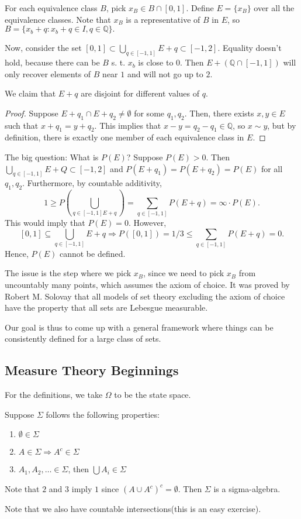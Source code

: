 \documentclass[11pt]{scrartcl}
\newcommand{\Q}{\mathbb{Q}}
\begin{document}
For each equivalence class $B$, pick $x_B \in B\cap [0, 1]$.  Define $E = \{x_B \}$ over all the equivalence classes.  Note that $x_B$ is a representative of $B$ in $E$, so $B = \{x_b + q : x_b + q \in I, q \in \Q \}.$  

Now, consider the set $[0, 1] \subset \bigcup_{q \in [-1, 1]}E + q \subset [-1, 2]$.  Equality doesn't hold, because there can be $B$ s. t. $x_b$ is close to $0$.  Then $E + (\Q \cap [-1, 1])$ will only recover elements of $B$ near $1$ and will not go up to $2$.

\begin{proposition} We claim that $E+q$ are disjoint for different values of $q$.
\end{proposition}
\begin{proof}
Suppose $E+q_1 \cap E+q_2 \ne \emptyset$ for some $q_1, q_2$.  Then, there exists $x, y \in E$ such that $x+q_1 = y + q_2$.  This implies that $x-y = q_2 - q_1 \in \Q$, so $x \sim y$, but by definition, there is exactly one member of each equivalence class in $E$.  
\end{proof}

The big question: What is $P(E)$?  Suppose $P(E) > 0$.  Then $\bigcup_{q \in [-1, 1]} E + Q \subset [-1, 2]$ and $P(E + q_1) = P(E + q_2) = P(E)$ for all $q_1, q_2$.  Furthermore, by countable additivity,
$$1 \ge P(\bigcup_{q \in [-1, 1] E + q}) = \sum_{q \in [-1, 1]} P(E + q) = \infty \cdot P(E).$$
This would imply that $P(E) = 0$.  However, $$[0, 1] \subseteq \bigcup_{q \in [-1, 1]}E + q \Rightarrow P([0, 1]) = 1/3 \le \sum_{q \in[-1, 1]} P(E+q) = 0.$$  Hence, $P(E)$ cannot be defined.

The issue is the step where we pick $x_B$, since we need to pick $x_B$ from uncountably many points, which assumes the axiom of choice.  It was proved by Robert M. Solovay that all models of set theory excluding the axiom of choice have the property that all sets are Lebesgue measurable.

Our goal is thus to come up with a general framework where things can be consistently defined for a large class of sets.  
\subsection{Measure Theory Beginnings}  For the definitions, we take $\Omega$ to be the state space.
\begin{definition}  Suppose $\Sigma$ follows the following properties:
\begin{enumerate}
\item $\emptyset \in \Sigma$
\item $A \in \Sigma \Rightarrow A^c \in \Sigma$
\item $A_1, A_2, \dots \in \Sigma$, then $\bigcup A_i \in \Sigma$
\end{enumerate}
Note that $2$ and $3$ imply $1$ since $(A \cup A^c)^c = \emptyset$.  Then $\Sigma$ is a sigma-algebra.
\end{definition}
Note that we also have countable intersections(this is an easy exercise).
\end{document}
